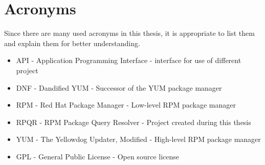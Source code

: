 





\chapter{Acronyms}

Since there are many used acronyms in this thesis, it is appropriate to list them and explain them
for better understanding.

\begin{itemize}
  \item API - Application Programming Interface - interface for use of different project
  \item DNF - Dandified YUM - Successor of the YUM package manager
  \item RPM - Red Hat Package Manager - Low-level RPM package manager 
  \item RPQR - RPM Package Query Resolver - Project created during this thesis
  \item YUM - The Yellowdog Updater, Modified - High-level RPM package manager
  \item GPL - General Public License - Open source license
\end{itemize}

